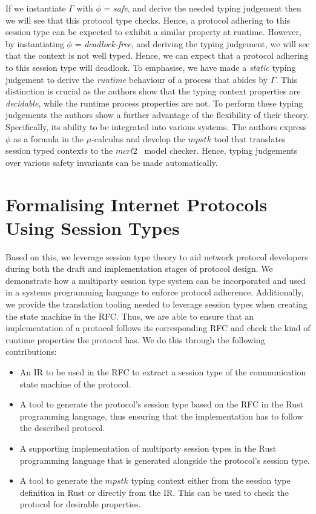 \documentclass{article}
\newcommand{\type}[1]{\texttt{#1}}
\begin{document}
If we instantiate \type{\ensuremath{\Gamma}} with \type{\ensuremath{\phi}} = \textit{safe}, and derive the needed typing judgement then we will see that this protocol type checks.
Hence, a protocol adhering to this session type can be expected to exhibit a similar property at runtime. 
However, by instantiating \type{\ensuremath{\phi}} = \textit{deadlock-free}, and deriving the typing judgement, we will see that the context is not well typed.
Hence, we can expect that a protocol adhering to this session type will deadlock.
To emphasise, we have made a \textit{static} typing judgement to derive the \textit{runtime} behaviour of a process that abides by \type{\ensuremath{\Gamma}}.
This distinction is crucial as the authors show that the typing context properties are \textit{decidable}, while the runtime process properties are not.
To perform these typing judgements the authors show a further advantage of the flexibility of their theory.
Specifically, its ability to be integrated into various systems.
The authors express \type{\ensuremath{\phi}} as a formula in the \type{\ensuremath{\mu}}-calculus and develop the \ensuremath{mpstk} tool that translates session typed contexts to the \ensuremath{mcrl2}~\cite{BGKLNVWWW19} model checker.
Hence, typing judgements over various safety invariants can be made automatically.

\section{Formalising Internet Protocols Using Session Types}

Based on this, we leverage session type theory to aid network protocol developers during both the draft and implementation stages of protocol design.
We demonstrate how a multiparty session type system can be incorporated and used in a systems programming language to enforce protocol adherence.
Additionally, we provide the translation tooling needed to leverage session types when creating the state machine in the RFC.
Thus, we are able to ensure that an implementation of a protocol follows its corresponding RFC and check the kind of runtime properties the protocol has.
We do this through the following contributions:

\begin{itemize}
    \item An IR to be used in the RFC to extract a session type of the communication state machine of the protocol.
    \item A tool to generate the protocol's session type based on the RFC in the Rust programming language, thus ensuring that the implementation has to follow the described protocol.
    \item A supporting implementation of multiparty session types in the Rust programming language that is generated alongside the protocol's session type.
    \item A tool to generate the \ensuremath{mpstk} typing context either from the session type definition in Rust or directly from the IR. This can be used to check the protocol for desirable properties.
\end{itemize}
\end{document}

